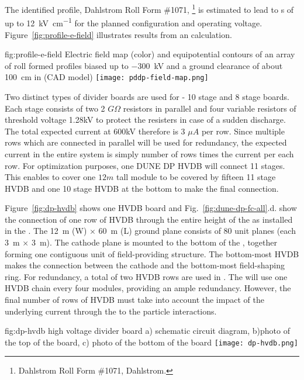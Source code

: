 The identified profile, Dahlstrom Roll Form \#1071,
\footnote{Dahlstrom Roll Form \#1071, Dahlstrom\texttrademark{}.}  is estimated to lead to \efield{}s of up to \SI{12}{\kV\per\cm}  
for the planned \fc configuration and operating voltage. Figure~\ref{fig:profile-e-field} illustrates results from an \efield calculation.


\begin{dunefigure}
{fig:profile-e-field}
{Electric field map (color) and equipotential contours of an array of roll formed profiles biased up to \SI{-300}{\kV} and a ground clearance of about \SI{100}{\cm} in (CAD model)} \texttt{[image: pddp-field-map.png]}
\end{dunefigure}

Two distinct types of \hv divider boards are used for  - 10 stage and 8 stage boards.  Each stage consists of two 2 $G\Omega$ resistors in parallel and four variable resistors of threshold voltage 1.28kV to protect the resisters in case of a sudden discharge.  The total expected current at 600kV therefore is 3 $\mu A$ per row.  Since multiple rows which are connected in parallel will be used for redundancy, the expected current in the entire system is simply number of rows times the current per each row.
For optimization purposes, one DUNE DP HVDB will connect 11 stages.  This enables to cover one $12m$ tall module to be covered by fifteen 11 stage HVDB and one 10 stage HVDB at the bottom to make the final connection.  


Figure~\ref{fig:dp-hvdb} shows one HVDB board and  Fig.~\ref{fig:dune-dp-fc-all}.d. show the connection of one row of HVDB through the entire height of the \fc as installed in the . The  \SI{12}{\m} (W) $\times$ \SI{60}{\m} (L) ground plane consists of 80 unit planes (each \SI{3}{\m} $\times$ \SI{3}{\m}).  
The cathode plane is mounted to the bottom of the \fc, together forming one contiguous unit of field-providing structure.  The bottom-most HVDB makes the connection between the cathode and the bottom-most field-shaping ring.
For redundancy, a total of two HVDB rows are used in .  
The \dpmod will use one HVDB chain every four \fc modules, providing an ample redundancy.  However, the final number of rows of HVDB must take into account the impact of the underlying current through the \fc to the particle interactions.


\begin{dunefigure}[DP HVDB]{fig:dp-hvdb}{ high voltage divider board a) schematic circuit diagram, b)photo of the top of the board, c) photo of the bottom of the board}
\texttt{[image: dp-hvdb.png]}
\end{dunefigure}


